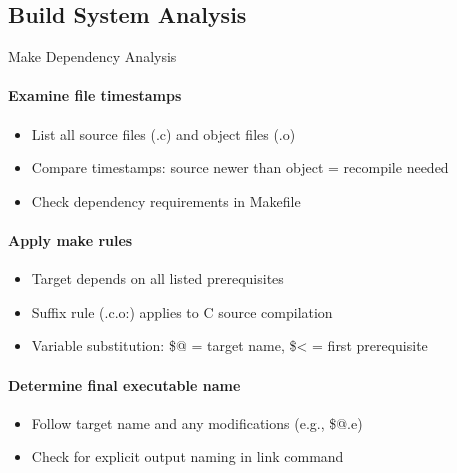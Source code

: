 
\raggedcolumns
\columnbreak

\subsection{Build System Analysis}

\begin{KR}{Make Dependency Analysis}
    \paragraph{Examine file timestamps}
    \begin{itemize}
        \item List all source files (.c) and object files (.o)
        \item Compare timestamps: source newer than object = recompile needed
        \item Check dependency requirements in Makefile
    \end{itemize}
    
    \paragraph{Apply make rules}
    \begin{itemize}
        \item Target depends on all listed prerequisites
        \item Suffix rule (.c.o:) applies to C source compilation
        \item Variable substitution: \$@ = target name, \$< = first prerequisite
    \end{itemize}
    
    \paragraph{Determine final executable name}
    \begin{itemize}
        \item Follow target name and any modifications (e.g., \$@.e)
        \item Check for explicit output naming in link command
    \end{itemize}
\end{KR}

